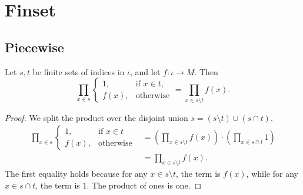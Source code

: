 \chapter{Finset} 

\section{Piecewise}

\begin{lemma}\label{lem:prod_ite_not_mem}
    \leanok
    Let $s, t$ be finite sets of indices in $\iota$, and let $f \colon \iota \to M$. 
    Then
    \[
    \prod_{x \in s} 
    \begin{cases}
    1, & \text{if } x \in t, \\
    f(x), & \text{otherwise}
    \end{cases}
    =
    \prod_{x \in s \setminus t} f(x).
    \]
\end{lemma}
\begin{proof}
    \leanok
    We split the product over the disjoint union $s = (s \setminus t) \cup (s \cap t)$.
    \begin{align*}
    \prod_{x \in s} 
    \begin{cases}
    1, & \text{if } x \in t \\
    f(x), & \text{otherwise}
    \end{cases}
    &=
    \left( \prod_{x \in s \setminus t} f(x) \right)
    \cdot
    \left( \prod_{x \in s \cap t} 1 \right) \\
    &= \prod_{x \in s \setminus t} f(x).
    \end{align*}
    The first equality holds because for any $x \in s \setminus t$, the term is $f(x)$, while for any $x \in s \cap t$, the term is $1$. 
    The product of ones is one.
\end{proof}


